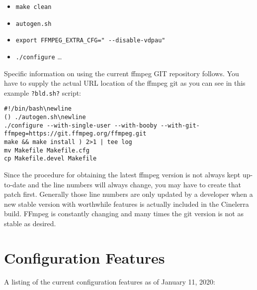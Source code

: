 \begin{itemize}[label={},nosep]
	\item \texttt{make clean}
	\item \texttt{autogen.sh}
	\item \texttt{export FFMPEG\_EXTRA\_CFG=" -{}-disable-vdpau"} 
	\item \texttt{./configure} {\dots}
\end{itemize}

Specific information on using the current ffmpeg GIT repository follows.  You have to supply the actual URL location of the ffmpeg git as you can see in this example \texttt{?bld.sh?} script:

\begin{lstlisting}[numbers=none]
#!/bin/bash\newline
() ./autogen.sh\newline
./configure --with-single-user --with-booby --with-git-ffmpeg=https://git.ffmpeg.org/ffmpeg.git
make && make install ) 2>1 | tee log
mv Makefile Makefile.cfg
cp Makefile.devel Makefile
\end{lstlisting}

Since the procedure for obtaining the latest ffmpeg version is not always kept up-to-date and the line numbers will always change, you may have to create that patch first. Generally those line numbers are only updated by a developer when a new stable version with worthwhile features is actually included in the Cinelerra build. FFmpeg is constantly changing and many times the git version is not as stable as desired.

\section{Configuration Features}
\label{sec:configuration_features}

A listing of the current configuration features as of January 11, 2020:

